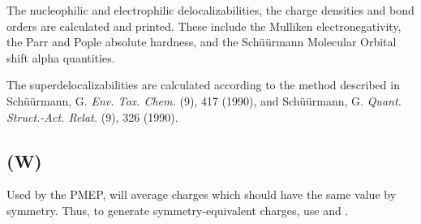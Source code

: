 The nucleophilic and electrophilic delocalizabilities, the charge densities and
bond orders are calculated and printed.  These include the Mulliken
electronegativity, the Parr and Pople absolute hardness, and the Sch\"{u}\"{u}rmann
Molecular Orbital shift alpha quantities.

The superdelocalizabilities are calculated according to the method described in
Sch\"{u}\"{u}rmann, G. {\em Env. Tox. Chem.} (9), 417 (1990), and
Sch\"{u}\"{u}rmann, G. {\em Quant. Struct.-Act. Relat.} (9), 326 (1990).
\subsection*{ (W)}
Used by the PMEP,  will average charges which should  have  the
same value by symmetry.  Thus, to generate symmetry-equivalent charges,
use  and .

